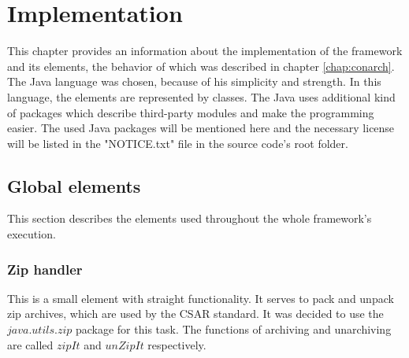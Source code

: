 
\chapter{Implementation}\label{chap:imp}
This chapter provides an information about the implementation of the framework and its elements, the behavior of which was described in chapter \ref{chap:conarch}.
The Java language was chosen, because of his simplicity and strength. 
In this language, the elements are represented by classes.
The Java uses additional kind of packages which describe third-party modules and make the programming easier. 
The used Java packages will be mentioned here and the necessary license will be listed in the "NOTICE.txt" file in the source code's root folder.

\section{Global elements}
This section describes the elements used throughout the whole framework's execution.

\subsection*{Zip handler}
This is a small element with straight functionality. 
It serves to pack and unpack zip archives, which are used by the CSAR standard.
It was decided to use the $java$.$utils$.$zip$ package for this task.
The functions of archiving and unarchiving are called $zipIt$ and $unZipIt$ respectively. 

